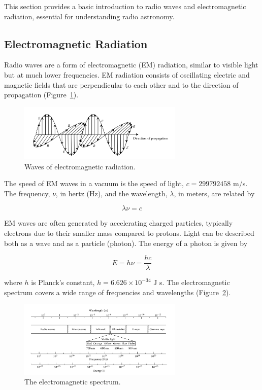 This section provides a basic introduction to radio waves and electromagnetic radiation, essential for understanding radio astronomy.

\subsection{Electromagnetic Radiation}

Radio waves are a form of electromagnetic (EM) radiation, similar to visible light but at much lower frequencies. EM radiation consists of oscillating electric and magnetic fields that are perpendicular to each other and to the direction of propagation (Figure~\ref{fig:em_waves}).

\begin{figure}[H]
    \centering
    \includegraphics[width=0.7\textwidth]{Images/em_waves.png}
    \caption{Waves of electromagnetic radiation.}
    \label{fig:em_waves}
\end{figure}

The speed of EM waves in a vacuum is the speed of light, $c = 299 792 458$ m/s. The frequency, $\nu$, in hertz (Hz), and the wavelength, $\lambda$, in meters, are related by

\begin{equation}
    \lambda \nu = c
\end{equation}

EM waves are often generated by accelerating charged particles, typically electrons due to their smaller mass compared to protons. Light can be described both as a wave and as a particle (photon). The energy of a photon is given by

\begin{equation}
    E = h\nu = \frac{hc}{\lambda}
\end{equation}

where $h$ is Planck’s constant, $h = 6.626 \times 10^{-34}$ J s. The electromagnetic spectrum covers a wide range of frequencies and wavelengths (Figure~\ref{fig:em_spectrum}).

\begin{figure}[H]
    \centering
    \includegraphics[width=0.7\textwidth]{Images/em_spectrum.png}
    \caption{The electromagnetic spectrum.}
    \label{fig:em_spectrum}
\end{figure}

